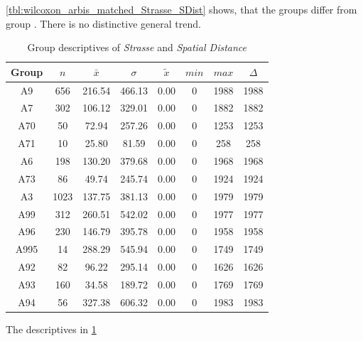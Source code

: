 \cref{tbl:wilcoxon_arbis_matched_Strasse_SDist} shows, that the groups  differ from group . There is no distinctive general trend.
\begin{table}[ht!]
	\tiny
	\centering
	\begin{tabular}{c|c|c|c|c|c|c|c}
		\toprule
		Group & $n$ & $\bar{x}$ & $\sigma$ & $\tilde{x}$ & $min$ & $max$ & $\Delta$ \\
		\midrule
		A9   & 656  & 216.54 & 466.13 & 0.00 & 0 & 1988 & 1988 \\ 
		A7   & 302  & 106.12 & 329.01 & 0.00 & 0 & 1882 & 1882 \\ 
		A70  & 50   & 72.94  & 257.26 & 0.00 & 0 & 1253 & 1253 \\ 
		A71  & 10   & 25.80  & 81.59  & 0.00 & 0 & 258  & 258  \\ 
		A6   & 198  & 130.20 & 379.68 & 0.00 & 0 & 1968 & 1968 \\ 
		A73  & 86   & 49.74  & 245.74 & 0.00 & 0 & 1924 & 1924 \\ 
		A3   & 1023 & 137.75 & 381.13 & 0.00 & 0 & 1979 & 1979 \\ 
		A99  & 312  & 260.51 & 542.02 & 0.00 & 0 & 1977 & 1977 \\ 
		A96  & 230  & 146.79 & 395.78 & 0.00 & 0 & 1958 & 1958 \\ 
		A995 & 14   & 288.29 & 545.94 & 0.00 & 0 & 1749 & 1749 \\ 
		A92  & 82   & 96.22  & 295.14 & 0.00 & 0 & 1626 & 1626 \\ 
		A93  & 160  & 34.58  & 189.72 & 0.00 & 0 & 1769 & 1769 \\ 
		A94  & 56   & 327.38 & 606.32 & 0.00 & 0 & 1983 & 1983 \\ 
		\bottomrule
	\end{tabular}
	\caption{Group descriptives of \textit{Strasse} and \textit{Spatial Distance}}
	\label{tbl:descriptives_arbis_matched_Strasse_SDist}
\end{table}
The descriptives in \cref{tbl:descriptives_arbis_matched_Strasse_SDist}

